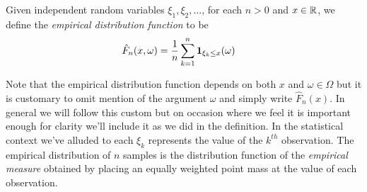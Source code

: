 \begin{defn}Given independent random variables $\xi_1, \xi_2, \dots$,
  for each $n > 0$  and $x \in \mathbb{R}$, we define the \emph{empirical distribution
    function} to be
\begin{align*}
\hat{F}_n(x, \omega) &= \frac{1}{n} \sum_{k=1}^n \textbf{1}_{\xi_k \leq x}(\omega)
\end{align*}
\end{defn}
Note that the empirical distribution function depends on both $x$ and
$\omega \in \Omega$ but it is customary to omit mention of the
argument $\omega$ and simply write $\hat{F}_n(x)$.  In general we will follow this custom but on
occasion where we feel it is important enough for clarity we'll
include it as we did in the definition.  In the statistical context we've alluded to each $\xi_k$ represents
the value of the $k^{th}$ observation.  The empirical distribution of
$n$ samples is the distribution function of the \emph{empirical
  measure} obtained by placing an equally weighted point mass at the value of each observation.

